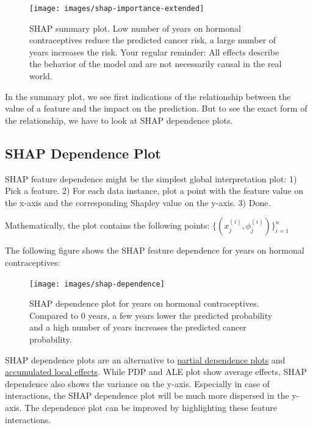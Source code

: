 \documentclass[
  12pt,
]{krantz}
\begin{document}
\begin{figure}

{\centering \texttt{[image: images/shap-importance-extended]} 

}

\caption{SHAP summary plot. Low number of years on hormonal contraceptives reduce the predicted cancer risk, a large number of years increases the risk. Your regular reminder: All effects describe the behavior of the model and are not necessarily causal in the real world.}\label{fig:unnamed-chunk-46}
\end{figure}

In the summary plot, we see first indications of the relationship between the value of a feature and the impact on the prediction.
But to see the exact form of the relationship, we have to look at SHAP dependence plots.

\hypertarget{shap-dependence-plot}{%
\subsection{SHAP Dependence Plot}\label{shap-dependence-plot}}

SHAP feature dependence might be the simplest global interpretation plot:
1) Pick a feature.
2) For each data instance, plot a point with the feature value on the x-axis and the corresponding Shapley value on the y-axis.
3) Done.

Mathematically, the plot contains the following points: \(\{(x_j^{(i)},\phi_j^{(i)})\}_{i=1}^n\)

The following figure shows the SHAP feature dependence for years on hormonal contraceptives:

\begin{figure}

{\centering \texttt{[image: images/shap-dependence]} 

}

\caption{SHAP dependence plot for years on hormonal contraceptives. Compared to 0 years, a few years lower the predicted probability and a high number of years increases the predicted cancer probability.}\label{fig:unnamed-chunk-47}
\end{figure}

SHAP dependence plots are an alternative to \protect\hyperlink{pdp}{partial dependence plots} and \protect\hyperlink{ale}{accumulated local effects}.
While PDP and ALE plot show average effects, SHAP dependence also shows the variance on the y-axis.
Especially in case of interactions, the SHAP dependence plot will be much more dispersed in the y-axis.
The dependence plot can be improved by highlighting these feature interactions.
\end{document}
